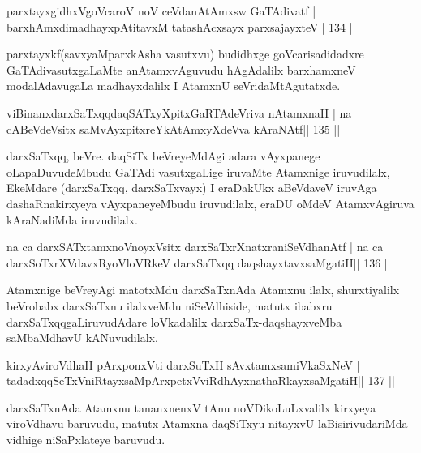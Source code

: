 \begin{shl}
parxtayxgidhxVgoVcaroV noV ceVdanAtAmx\s sw GaTAdivatf |
barxhAmxdimadhayxpAtitavxM tatashAcxsayx parxsajayxteV\hfill || 134 ||
\end{shl}

\begin{artha}
parxtayxkf(savxyaMparxkAsha vasutxvu) budidhxge goVcarisadidadxre GaTAdivasutxgaLaMte anAtamxvAguvudu hAgAdalilx barxhamxneV modalAdavugaLa madhayxdalilx I AtamxnU seVridaMtAgutatxde.
\end{artha}

\begin{shl}
viBinanxdarxSaTxqqdaqSATxyXpitxGaRTAdeVriva nA\s\s tamxnaH |
na cABeVdeV\s sitx saMvAyxpitxreYkAtAmxyXdeVva kAraNAtf\hfill || 135 ||
\end{shl}

\begin{artha}
darxSaTxqq, beVre. daqSiTx beVreyeMdAgi adara vAyxpanege oLapaDuvudeMbudu GaTAdi vasutxgaLige iruvaMte Atamxnige iruvudilalx, EkeMdare (darxSaTxqq, darxSaTxvayx) I eraDakUkx aBeVdaveV iruvAga dashaRnakirxyeya vAyxpaneyeMbudu iruvudilalx, eraDU oMdeV AtamxvAgiruva kAraNadiMda iruvudilalx.
\end{artha}

\begin{shl}
na ca darxSATx\s\s tamxnoV\s noyxV\s sitx darxSaTxrXnatxraniSeVdhanAtf |
na ca darxSoTxrXVdavxRyoVloVRkeV darxSaTxqq daqshayxtavxsaMgatiH\hfill || 136 ||
\end{shl}

\begin{artha}
Atamxnige beVreyAgi matotxMdu darxSaTxnAda Atamxnu ilalx, shurxtiyalilx beVrobabx darxSaTxnu ilalxveMdu niSeVdhiside, matutx ibabxru darxSaTxqqgaLiruvudAdare loVkadalilx darxSaTx-daqshayxveMba saMbaMdhavU kANuvudilalx.
\end{artha}


\begin{shl}
kirxyAviroVdhaH pArxponxVti darxSuTxH sAvxtamxsamiVkaSxNeV |
tadadxqqSeTxVniRtayxsaMpArxpetxVviRdhAyxnathaRkayxsaMgatiH\hfill || 137 ||
\end{shl}

\begin{artha}
darxSaTxnAda Atamxnu tananxnenxV tAnu noVDikoLuLxvalilx kirxyeya viroVdhavu baruvudu, matutx Atamxna daqSiTxyu nitayxvU laBisirivudariMda vidhige niSaPxlateye baruvudu.
\end{artha}

